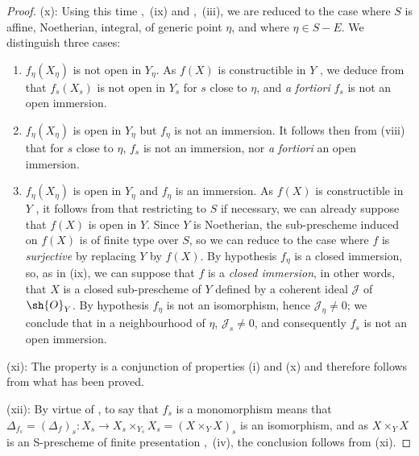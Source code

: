 \begin{proof}
(x): Using this time ,~(ix) and ,~(iii), we are reduced to the case where $S$ is affine, Noetherian, integral, of generic point $\eta$, and where $\eta\in S-E$.
We distinguish three cases:
\begin{enumerate}[label=\upshape{$\arabic{enumi}^\circ$}]
  \item $f_\eta(X_\eta)$ is not open in $Y_\eta$.
  As $f(X)$ is constructible in $Y$ , we deduce from  that $f_s(X_s)$ is not open in $Y_s$ for $s$ close to $\eta$, and \emph{a fortiori} $f_s$ is not an open immersion.

  \item $f_\eta(X_\eta)$ is open in $Y_\eta$ but $f_\eta$ is not an immersion.
  It follows then from (viii) that for $s$ close to $\eta$, $f_s$ is not an immersion, nor \emph{a fortiori} an open immersion.

  \item $f_\eta(X_\eta)$ is open in $Y_\eta$ and $f_\eta$ is an immersion.
  As $f(X)$ is constructible in $Y$ , it follows from  that restricting to $S$ if necessary, we can already suppose that $f(X)$ is open in $Y$.
  Since $Y$ is Noetherian, the sub-prescheme induced on $f(X)$ is of finite type over $S$, so we can reduce to the case where $f$ is \emph{surjective} by replacing $Y$ by $f(X)$.
  By hypothesis $f_\eta$ is a closed immersion, so, as in (ix), we can suppose that $f$ is a \emph{closed immersion}, in other words, that $X$ is a closed sub-prescheme of $Y$ defined by a coherent ideal $\mathscr{J}$ of $\sh{O}_Y$.
  By hypothesis $f_\eta$ is not an isomorphism, hence $\mathscr{J}_\eta\neq 0$; we conclude  that in a neighbourhood of $\eta$, $\mathscr{J}_s\neq 0$, and consequently $f_s$ is not an open immersion.
\end{enumerate}

(xi): The property is a conjunction of properties (i) and (x) and therefore follows from what has been proved.

(xii): By virtue of , to say that $f_s$ is a monomorphism means that $\Delta_{f_s}=(\Delta_f)_s:X_s\to X_s\times_{Y_s} X_s=(X\times_Y X)_s$ is an isomorphism, and as $X\times_Y X$ is an S-prescheme of finite presentation ,~(iv), the conclusion follows from (xi).
\end{proof}

